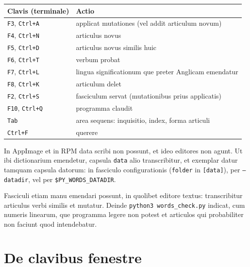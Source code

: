 \documentclass[12pt,
              article,
              oneside
              ]{memoir}
\newcommand*{\key}[1]{\texttt{#1}}
\begin{document}
%
\begin{longtable}{@{}>{\raggedright}p{}p{}@{}}
\toprule
Clavis (terminale) & Actio\\
\midrule
\endhead
\key{F3}, \key{Ctrl+A} & applicat mutationes (vel addit articulum novum)\\
\key{F4}, \key{Ctrl+N} & articulus novus\\
\key{F5}, \key{Ctrl+D} & articulus novus similis huic\\
\key{F6}, \key{Ctrl+T} & verbum probat\\
\key{F7}, \key{Ctrl+L} & lingua significationum que preter Anglicam emendatur\\
\key{F8}, \key{Ctrl+K} & articulum delet\\
\key{F2}, \key{Ctrl+S} & fasciculum servat (mutationibus prius applicatis)\\
\key{F10}, \key{Ctrl+Q} & programma claudit\\
\key{Tab} & area sequens: inquisitio, index, forma articuli\\
\key{Ctrl+F} & querere\\
\bottomrule
\end{longtable}

\noindent{}%
In AppImage et in RPM data scribi non possunt, et ideo editores non
agunt. Ut ibi dictionarium emendetur, capsula \texttt{data} alio
transcribitur, et exemplar datur tamquam capsula datorum: in fasciculo
configurationis (\texttt{folder} in \texttt{[data]}), per
\texttt{--datadir}, vel per \texttt{\$PY\_WORDS\_DATADIR}.

%
Fasciculi etiam manu emendari possunt, in quolibet editore textus:
transcribitur articulus verbi similis et mutatur. Deinde \texttt{python3
words\_check.py} indicat, cum numeris linearum, que programma legere non
potest et articulos qui probabiliter non faciunt quod intendebatur.

\section{De clavibus fenestre}
\label{sec:keys}
\end{document}
